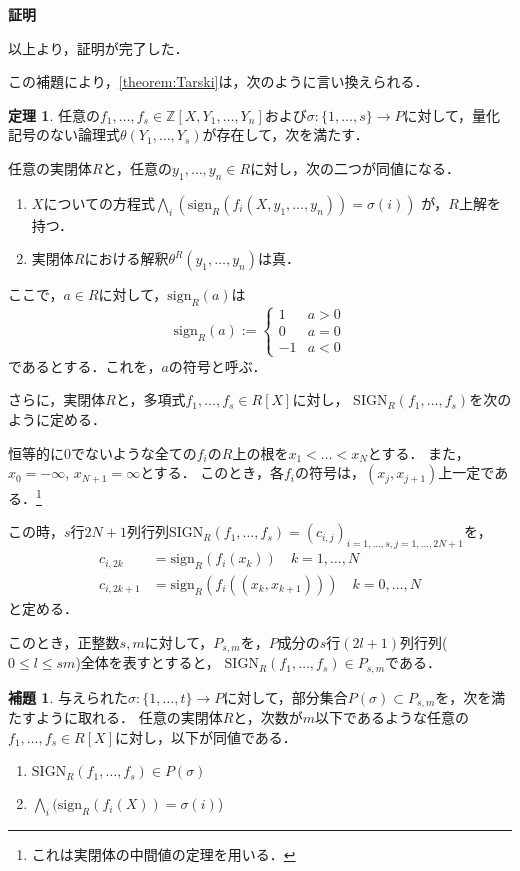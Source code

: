 \documentclass[uplatex, dvipdfmx]{jsarticle}
\makeatletter
\renewenvironment{proof}[1][\proofname]{\par
  \pushQED{\qed}%
  \normalfont \topsep6\p@\@plus6\p@\relax
  \trivlist
  \item\relax
  {\bfseries
  #1\@addpunct{.}}\hspace\labelsep\ignorespaces
}{%
  \popQED\endtrivlist\@endpefalse
}
\newcommand{\Z}{\mathbb{Z}}
\newcommand{\sign}{\mathrm{sign}}
\newcommand{\SIGN}{\mathrm{SIGN}}
\newcommand{\map}[3]{{#1}:{#2}\rightarrow{#3}}
\theoremstyle{definition}
\newtheorem{lemma}{補題}[section]
\newtheorem{theorem}{定理}[section]
\renewcommand{\proofname}{\textbf{証明}}
\makeatother
\begin{document}
\begin{proof}
     以上より，証明が完了した．
\end{proof}

この補題により，\cref{theorem:Tarski}は，次のように言い換えられる．

\begin{theorem}\label{theorem:weak_Tarski}
     任意の$f_1, \dots, f_s \in \Z[X,Y_1, \dots, Y_n]$および$\map{\sigma}{\{1, \dots, s\}}{P}$に対して，量化記号のない論理式$\theta(Y_1, \dots, Y_s)$が存在して，次を満たす．

     任意の実閉体$R$と，任意の$y_1, \dots, y_n \in R$に対し，次の二つが同値になる．
     \begin{enumerate}
          \item $X$についての方程式$\bigwedge_i (\sign_R(f_i(X,y_1, \dots, y_n)) = \sigma(i))$ が，$R$上解を持つ．
          \item 実閉体$R$における解釈$\theta^R(y_1, \dots, y_n)$は真．
     \end{enumerate}
\end{theorem}

ここで，$a \in R$に対して，$\sign_R(a)$は
\[
     \sign_R(a) :=
     \begin{cases}
          1 & a > 0 \\
          0 & a = 0 \\
          -1 & a < 0
     \end{cases}
\]
であるとする．これを，$a$の符号と呼ぶ．

さらに，実閉体$R$と，多項式$f_1, \dots, f_s \in R[X]$に対し，
$\SIGN_R(f_1, \dots, f_s)$を次のように定める．

恒等的に0でないような全ての$f_i$の$R$上の根を$x_1< \dots< x_N$とする．
また，$x_0 = -\infty$, $x_{N+1} = \infty$とする．
このとき，各$f_i$の符号は，$(x_j, x_{j+1})$上一定である．\footnote{これは実閉体の中間値の定理を用いる．}

この時，$s$行$2N+1$列行列$\SIGN_R(f_1, \dots, f_s) = (c_{i,j})_{i=1, \dots, s, j=1, \dots, 2N+1}$を，
\begin{align*}
     c_{i,2k} &= \sign_R(f_i(x_k)) \quad k=1, \dots, N\\
     c_{i,2k+1} &= \sign_R(f_i((x_k, x_{k+1}))) \quad k=0, \dots, N
\end{align*}
と定める．

このとき，正整数$s, m$に対して，$P_{s,m}$を，$P$成分の$s$行$(2l+1)$列行列($0 \leq l \leq sm$)全体を表すとすると，
$\SIGN_R(f_1, \dots, f_s) \in P_{s,m}$である．

\begin{lemma}\label{lemma:qe_1ststep}
     与えられた$\map{\sigma}{\{1, \dots, t\}}{P}$に対して，部分集合$P(\sigma) \subset P_{s,m}$を，次を満たすように取れる．
     任意の実閉体$R$と，次数が$m$以下であるような任意の$f_1, \dots, f_s \in R[X]$に対し，以下が同値である．
     \begin{enumerate}
          \item $\SIGN_R(f_1, \dots, f_s) \in P(\sigma)$
          \item $\bigwedge_i (\sign_R(f_i(X)) = \sigma(i)$)
     \end{enumerate}
\end{lemma}
\end{document}

